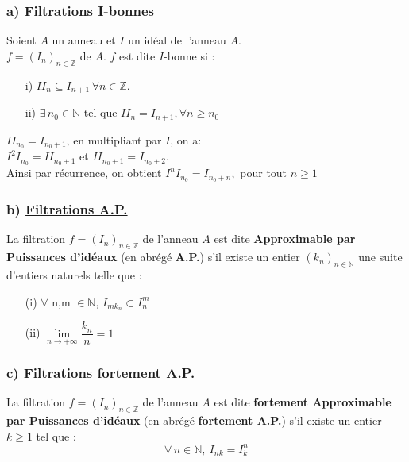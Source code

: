 \subsubsection{a) \underline{Filtrations I-bonnes}} 
\begin{madefinition}
	Soient $A$ un anneau et $I$ un idéal de l'anneau $A$.\\
	$f = (I_n)_{n \in \mathbb{Z}}$ de $A$. $f$ est dite $I$-bonne si : \\
	\begin{enumerate}
		\item[i)]$ II_n \subseteq I_{n+1} \, \forall n \in \mathbb{Z}$.\\
		\item[ii)]$\exists \, n_0 \in \mathbb{N}$ tel que $II_n = I_{n+1}, \forall n \geqslant n_0$
	\end{enumerate}
\end{madefinition}
\begin{maconsequence}
	$II_{n_0} = I_{n_{0}+1}$, en multipliant par $I$, on a:\\ $I^{2}I_{n_0} = II_{n_{0}+1}$ et $II_{n_0+1} = I_{n_{0}+2}$. \\
	Ainsi par récurrence, on obtient $I^{n}I_{n_0} = I_{n_{0}+n},$ pour tout $n \geqslant 1$ 
\end{maconsequence}
\subsubsection{b) \underline{Filtrations A.P.}}
\begin{madefinition}
	La filtration $f = (I_n)_{n \in \mathbb{Z}}$ de l'anneau $A$ est dite \textbf{Approximable par Puissances d'idéaux} (en abrégé \textbf{A.P.}) s'il existe un entier $(k_{n})_{n \in \mathbb{N}}$ une suite d'entiers naturels telle que :
	\begin{enumerate}
		\item[(i)] $\forall$ n,m $\in \mathbb{N}$, $I_{mk_n} \subset I_n^{m}$
		\item[(ii)] $\underset{n\longrightarrow +\infty }{\lim }\dfrac{k_{n}}{n}=1$
	\end{enumerate}
\end{madefinition}
\subsubsection{c) \underline{Filtrations fortement A.P.}}
\begin{madefinition}
	La filtration $f = (I_n)_{n \in \mathbb{Z}}$ de l'anneau $A$ est dite \textbf{fortement Approximable par Puissances d'idéaux} (en abrégé \textbf{fortement A.P.}) s'il existe un entier $k \geqslant 1$ tel que :
	\[ \forall \, n \in \mathbb{N}, \ I_{nk} = I_k^n \]
\end{madefinition}
